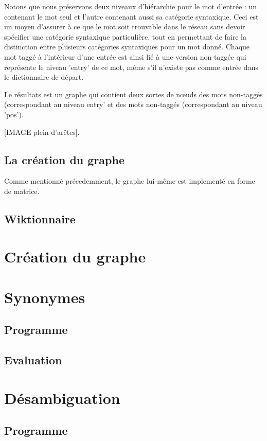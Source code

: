 \documentclass[a4paper, 12pt]{article}
\begin{document}
Notons que nous préservons deux niveaux d'hiérarchie pour le mot d'entrée : un 
contenant le mot seul et l'autre contenant aussi sa catégorie syntaxique. Ceci 
est un moyen d'assurer à ce que le mot soit trouvable dans le réseau sans devoir 
spécifier une catégorie syntaxique particulière, tout en permettant de faire la 
distinction entre plusieurs catégories syntaxiques pour un mot donné. Chaque mot 
taggé à l'intérieur d'une entrée est ainsi lié à une version non-taggée qui 
représente le niveau 'entry' de ce mot, même s'il n'existe pas comme entrée dans 
le dictionnaire de départ.

Le résultats est un graphe qui contient deux sortes de nœuds des mots non-taggés 
(correspondant au niveau entry' et des mots non-taggés (correspondant au niveau 
'pos').

[IMAGE plein d'arêtes].

\subsection{La création du graphe}
Comme mentionné précedemment, le graphe lui-même est implementé en forme de 
matrice.

\subsection{Wiktionnaire}


\section{Création du graphe}


\section{Synonymes}
\subsection{Programme}

\subsection{Evaluation}

\section{Désambiguation}
\subsection{Programme}
\end{document}
